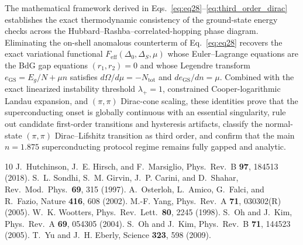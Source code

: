 \documentclass[aps,prb,twocolumn,superscriptaddress,longbibliography,floatfix]{revtex4-2}
\begin{document}
The mathematical framework derived in Eqs.~\eqref{eq:eq28}--\eqref{eq:third_order_dirac} establishes the exact thermodynamic consistency of the ground-state energy checks across the Hubbard--Rashba--correlated-hopping phase diagram. Eliminating the on-shell anomalous counterterm of Eq.~\eqref{eq:eq28} recovers the exact variational functional $F_{\mathrm{eff}}(\Delta_0,\Delta_S,\mu)$ whose Euler--Lagrange equations are the BdG gap equations $(r_1,r_2)=0$ and whose Legendre transform $e_{\mathrm{GS}} = E_g/N + \mu n$ satisfies $d\Omega/d\mu = -N_{\mathrm{tot}}$ and $de_{\mathrm{GS}}/dn = \mu$. Combined with the exact linearized instability threshold $\lambda_+ = 1$, constrained Cooper-logarithmic Landau expansion, and $(\pi,\pi)$ Dirac-cone scaling, these identities prove that the superconducting onset is globally continuous with an essential singularity, rule out candidate first-order transitions and hysteresis artifacts, classify the normal-state $(\pi,\pi)$ Dirac--Lifshitz transition as third order, and confirm that the main $n=1.875$ superconducting protocol regime remains fully gapped and analytic.

\begin{thebibliography}{10}
J.~Hutchinson, J.~E. Hirsch, and F.~Marsiglio, Phys.\ Rev.\ B \textbf{97}, 184513 (2018).
S.~L. Sondhi, S.~M. Girvin, J.~P. Carini, and D.~Shahar, Rev.\ Mod.\ Phys.\ \textbf{69}, 315 (1997).
A.~Osterloh, L.~Amico, G.~Falci, and R.~Fazio, Nature \textbf{416}, 608 (2002).
M.-F. Yang, Phys.\ Rev.\ A \textbf{71}, 030302(R) (2005).
W.~K. Wootters, Phys.\ Rev.\ Lett.\ \textbf{80}, 2245 (1998).
S.~Oh and J.~Kim, Phys.\ Rev.\ A \textbf{69}, 054305 (2004).
S.~Oh and J.~Kim, Phys.\ Rev.\ B \textbf{71}, 144523 (2005).
T.~Yu and J.~H. Eberly, Science \textbf{323}, 598 (2009).
\end{thebibliography}
\end{document}
